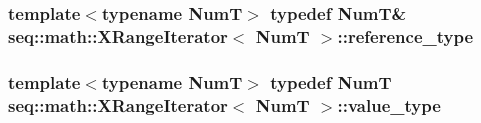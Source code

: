 \hypertarget{classseq_1_1math_1_1_x_range_iterator_a0bb59d21d7807cd3c0f354d4657ce543}{
\subsubsection[{reference\-\_\-type}]{\setlength{\rightskip}{0pt plus 5cm}template$<$typename Num\-T$>$ typedef Num\-T\& {\bf seq\-::math\-::\-X\-Range\-Iterator}$<$ Num\-T $>$\-::{\bf reference\-\_\-type}}}\label{classseq_1_1math_1_1_x_range_iterator_a0bb59d21d7807cd3c0f354d4657ce543}
\hypertarget{classseq_1_1math_1_1_x_range_iterator_a18b93b3a4ea6128dedb3668b35814bf0}{
\subsubsection[{value\-\_\-type}]{\setlength{\rightskip}{0pt plus 5cm}template$<$typename Num\-T$>$ typedef Num\-T {\bf seq\-::math\-::\-X\-Range\-Iterator}$<$ Num\-T $>$\-::{\bf value\-\_\-type}}}\label{classseq_1_1math_1_1_x_range_iterator_a18b93b3a4ea6128dedb3668b35814bf0}


